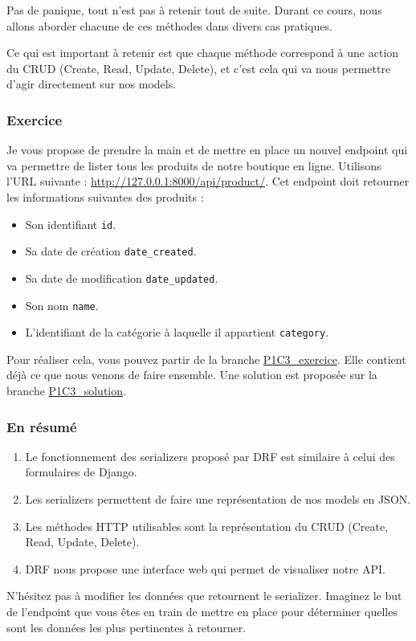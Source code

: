 Pas de panique, tout n’est pas à retenir tout de suite. Durant ce cours, nous allons aborder chacune de ces méthodes dans divers cas pratiques.

Ce qui est important à retenir est que chaque méthode correspond à une action du CRUD (Create, Read, Update, Delete), et c’est cela qui va nous permettre d’agir directement sur nos models.

\subsubsection*{Exercice}
Je vous propose de prendre la main et de mettre en place un nouvel endpoint qui va permettre de lister tous les produits de notre boutique en ligne. Utilisons l’URL suivante : \url{http://127.0.0.1:8000/api/product/}. Cet endpoint doit retourner les informations suivantes des produits :
\begin{itemize}
\item Son identifiant  {\tt id}.
\item Sa date de création  {\tt date\_created}.
\item Sa date de modification  {\tt date\_updated}.
\item Son nom  {\tt name}.
\item L’identifiant de la catégorie à laquelle il appartient  {\tt category}.
\end{itemize}
Pour réaliser cela, vous pouvez partir de la branche \href{https://github.com/OpenClassrooms-Student-Center/7192416\_APIs\_DRF/tree/P1C3\_exercice}{P1C3\_exercice}. Elle contient déjà ce que nous venons de faire ensemble. Une solution est proposée sur la branche \href{https://github.com/OpenClassrooms-Student-Center/7192416\_APIs\_DRF/tree/P1C3\_solution}{P1C3\_solution}.

\subsubsection*{En résumé}
\begin{enumerate}
\item Le fonctionnement des serializers proposé par DRF est similaire à celui des formulaires de Django.
\item Les serializers permettent de faire une représentation de nos models en JSON.
\item Les méthodes HTTP utilisables sont la représentation du CRUD (Create, Read, Update, Delete).
\item DRF nous propose une interface web qui permet de visualiser notre API.
\end{enumerate}
N’hésitez pas à modifier les données que retournent le serializer. Imaginez le but de l’endpoint que vous êtes en train de mettre en place pour déterminer quelles sont les données les plus pertinentes à retourner.
